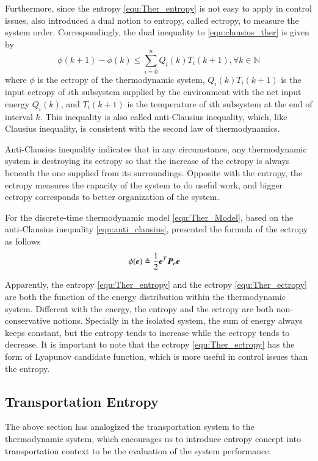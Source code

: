 \documentclass[preprint,authoryear,12pt]{elsarticle}
\renewcommand{\vec}[1]{\mbox{\boldmath$#1$}}
\newcommand{\mat}[1]{\mbox{\boldmath$#1$}}
\begin{document}
Furthermore, since the entropy \eqref{equ:Ther_entropy} is not easy
to apply in control issues, \citet{haddad_thermodynamic_2005} also
introduced a dual notion to entropy, called ectropy, to measure the
system order. Correspondingly, the dual inequality to
\eqref{equ:clausius_ther} is given by
\begin{equation}\label{equ:anti_clausius}
\phi(k+1)-\phi(k)\le \sum_{i=0}^n Q_i(k)T_i(k+1),
\forall k\in\mathbb{N}
\end{equation}
where $\phi$ is the ectropy of the thermodynamic system,
$Q_i(k)T_i(k+1)$ is the input ectropy of $i$th subsystem supplied by
the environment with the net input energy $Q_i(k)$, and $T_i(k+1)$ is
the temperature of $i$th subsystem at the end of interval $k$. This
inequality is also called anti-Clausius inequality, which, like
Clausius inequality, is consistent with the second law of
thermodynamics.

Anti-Clausius inequality indicates that in any circumstance, any
thermodynamic system is destroying its ectropy so that the increase
of the ectropy is always beneath the one supplied from its
surroundings. Opposite with the entropy, the ectropy measures the
capacity of the system to do useful work, and bigger ectropy
corresponds to better organization of the system.

For the discrete-time thermodynamic model \eqref{equ:Ther_Model},
based on the anti-Clausius inequality \eqref{equ:anti_clausius},
\citet{haddad_thermodynamic_2005} presented the formula of the
ectropy as follows
\begin{align}
\phi(\vec{e})&\triangleq\frac{1}{2}\vec{e}^T \mat{P}_e \vec{e}
\label{equ:Ther_ectropy}
\end{align}

Apparently, the entropy \eqref{equ:Ther_entropy} and the ectropy
\eqref{equ:Ther_ectropy} are both the function of the energy
distribution within the thermodynamic system. Different with the
energy, the entropy and the ectropy are both non-conservative
notions. Specially in the isolated system, the sum of energy always
keeps constant, but the entropy tends to increase while the ectropy
tends to decrease. It is important to note that the ectropy
\eqref{equ:Ther_ectropy} has the form of Lyapunov candidate function,
which is more useful in control issues than the entropy.

\subsection{Transportation Entropy}
The above section has analogized the transportation system to the
thermodynamic system, which encourages us to introduce entropy
concept into transportation context to be the evaluation of the
system performance.
\end{document}
